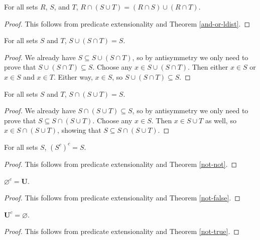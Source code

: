 \documentclass[../math.tex]{subfiles}
\begin{document}
\begin{theorem} \label{inter-ldist}
    For all sets $R$, $S$, and $T$, $R \cap (S \cup T) = (R \cap S) \cup (R \cap
    T)$.
\end{theorem}
\begin{proof}
    This follows from predicate extensionality and Theorem \ref{and-or-ldist}.
\end{proof}

\begin{theorem} \label{union-inter-self}
    For all sets $S$ and $T$, $S \cup (S \cap T) = S$.
\end{theorem}
\begin{proof}
    We already have $S \subseteq S \cup (S \cap T)$, so by antisymmetry we only
    need to prove that $S \cup (S \cap T) \subseteq S$.  Choose any $x \in S
    \cup (S \cap T)$.  Then either $x \in S$ or $x \in S$ and $x \in T$.  Either
    way, $x \in S$, so $S \cup (S \cap T) \subseteq S$.
\end{proof}

\begin{theorem} \label{inter-union-self}
    For all sets $S$ and $T$, $S \cap (S \cup T) = S$.
\end{theorem}
\begin{proof}
    We already have $S \cap (S \cup T) \subseteq S$, so by antisymmetry we only
    need to prove that $S \subseteq S \cap (S \cup T)$.  Choose any $x \in S$.
    Then $x \in S \cup T$ as well, so $x \in S \cap (S \cup T)$, showing that $S
    \subseteq S \cap (S \cup T)$.
\end{proof}

\begin{theorem} \label{compl-compl}
    For all sets $S$, $(S^c)^c = S$.
\end{theorem}
\begin{proof}
    This follows from predicate extensionality and Theorem \ref{not-not}.
\end{proof}

\begin{theorem} \label{compl-empty}
    $\varnothing^c = \bm U$.
\end{theorem}
\begin{proof}
    This follows from predicate extensionality and Theorem \ref{not-false}.
\end{proof}

\begin{theorem} \label{compl-all}
    $\bm U^c = \varnothing$.
\end{theorem}
\begin{proof}
    This follows from predicate extensionality and Theorem \ref{not-true}.
\end{proof}
\end{document}
